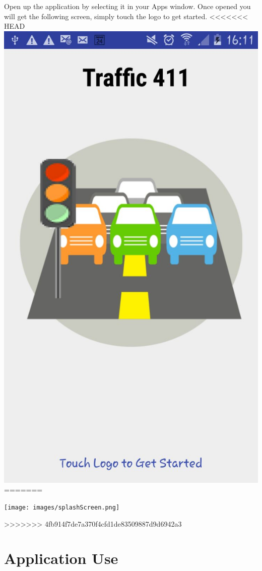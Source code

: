 \documentclass[a4paper,12pt]{article}
\begin{document}
Open up the application by selecting it in your Apps window. Once opened you will get the following screen, simply touch the logo to get started.
<<<<<<< HEAD
\includegraphics[width=\textwidth]{images/splashScreen.jpg}
=======
\begin{center}
\texttt{[image: images/splashScreen.png]}
\end{center}
>>>>>>> 4fb914f7de7a370f4cfd1de83509887d9d6942a3

\section{Application Use}
\end{document}
